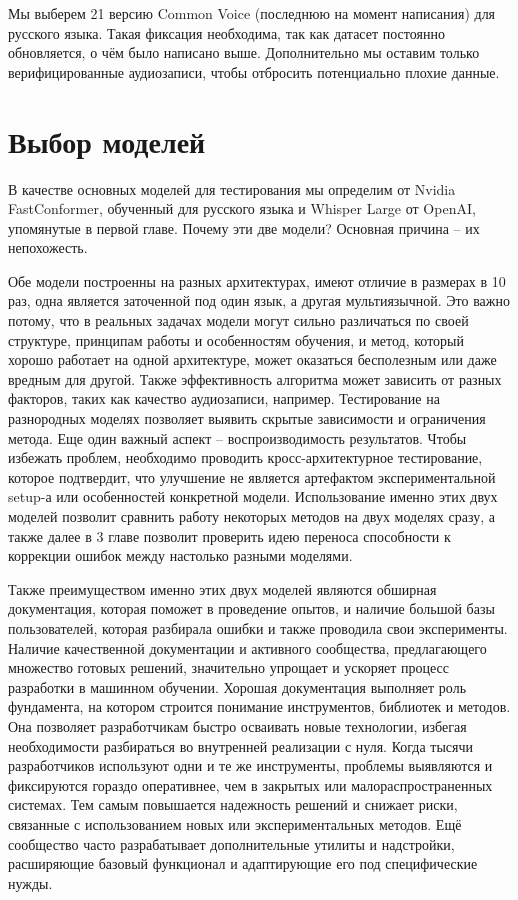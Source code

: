 Мы выберем 21 версию Common Voice (последнюю на момент написания) для русского языка.
Такая фиксация необходима, так как датасет постоянно обновляется, о чём было написано выше.
Дополнительно мы оставим только верифицированные аудиозаписи, чтобы отбросить потенциально плохие данные.

\section{Выбор моделей}
В качестве основных моделей для тестирования мы определим от Nvidia FastConformer, обученный для русского языка и Whisper Large от OpenAI, упомянутые в первой главе.
Почему эти две модели? Основная причина -- их непохожесть.

Обе модели построенны на разных архитектурах, имеют отличие в размерах в 10 раз, одна является заточенной под один язык, а другая мультиязычной.
Это важно потому, что в реальных задачах модели могут сильно различаться по своей структуре, принципам работы и особенностям обучения, и метод, который хорошо работает на одной архитектуре, может оказаться бесполезным или даже вредным для другой.
Также эффективность алгоритма может  зависить от разных факторов, таких как качество аудиозаписи, например.
Тестирование на разнородных моделях позволяет выявить скрытые зависимости и ограничения метода.
Еще один важный аспект -- воспроизводимость результатов.
Чтобы избежать проблем, необходимо проводить кросс-архитектурное тестирование, которое подтвердит, что улучшение не является артефактом экспериментальной setup-а или особенностей конкретной модели.
Использование именно этих двух моделей позволит сравнить работу некоторых методов на двух моделях сразу, а также далее в 3 главе позволит проверить идею переноса способности к коррекции ошибок между настолько разными моделями.

Также преимуществом именно этих двух моделей являются обширная документация, которая поможет в проведение опытов, и наличие большой базы пользователей, которая разбирала ошибки и также проводила свои эксперименты.
Наличие качественной документации и активного сообщества, предлагающего множество готовых решений, значительно упрощает и ускоряет процесс разработки в машинном обучении. Хорошая документация выполняет роль фундамента, на котором строится понимание инструментов, библиотек и методов. Она позволяет разработчикам быстро осваивать новые технологии, избегая необходимости разбираться во внутренней реализации с нуля.
Когда тысячи разработчиков используют одни и те же инструменты, проблемы выявляются и фиксируются гораздо оперативнее, чем в закрытых или малораспространенных системах.
Тем самым повышается надежность решений и снижает риски, связанные с использованием новых или экспериментальных методов.
Ещё сообщество часто разрабатывает дополнительные утилиты и надстройки, расширяющие базовый функционал и адаптирующие его под специфические нужды.

